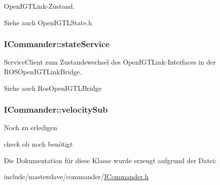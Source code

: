 Open\-I\-G\-T\-Link-\/\-Zustand. 

\begin{DoxySeeAlso}{Siehe auch}
Open\-I\-G\-T\-L\-State.\-h 
\end{DoxySeeAlso}
\hypertarget{classICommander_a2a10e7e0d95c6fe556879527ea18806e}{
\subsubsection[{state\-Service}]{\setlength{\rightskip}{0pt plus 5cm}I\-Commander\-::state\-Service\hspace{0.3cm}{\ttfamily [protected]}}}\label{classICommander_a2a10e7e0d95c6fe556879527ea18806e}


Service\-Client zum Zustandswechsel des Open\-I\-G\-T\-Link-\/\-Interfaces in der R\-O\-S\-Open\-I\-G\-T\-Link\-Bridge. 

\begin{DoxySeeAlso}{Siehe auch}
Ros\-Open\-I\-G\-T\-L\-Bridge 
\end{DoxySeeAlso}
\hypertarget{classICommander_a77d12525f98994352e2f2a450e04305b}{
\subsubsection[{velocity\-Sub}]{\setlength{\rightskip}{0pt plus 5cm}I\-Commander\-::velocity\-Sub\hspace{0.3cm}{\ttfamily [protected]}}}\label{classICommander_a77d12525f98994352e2f2a450e04305b}
\begin{DoxyRefDesc}{Noch zu erledigen}
\item[\hyperlink{todo__todo000005}{Noch zu erledigen}]check ob noch benötigt \end{DoxyRefDesc}


Die Dokumentation für diese Klasse wurde erzeugt aufgrund der Datei\-:\begin{DoxyCompactItemize}
\item 
include/masterslave/commander/\hyperlink{ICommander_8h}{I\-Commander.\-h}\end{DoxyCompactItemize}

